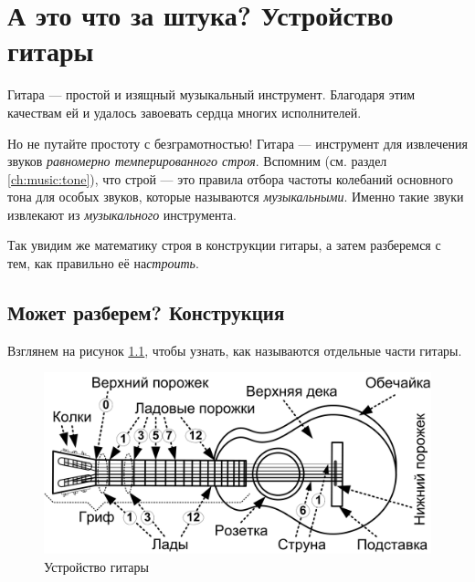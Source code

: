 \chapter{А это что за штука? Устройство гитары}
\label{ch:guitar}

Гитара --- простой и изящный музыкальный инструмент. Благодаря этим качествам ей и удалось завоевать сердца многих исполнителей.

Но не путайте простоту с безграмотностью! Гитара --- инструмент для извлечения звуков \emph{равномерно темперированного строя}. Вспомним (см. раздел \ref{ch:music:tone}), что строй --- это правила отбора частоты колебаний основного тона для особых звуков, которые называются \emph{музыкальными}. Именно такие звуки извлекают из \emph{музыкального} инструмента.

Так увидим же математику строя в конструкции гитары, а затем разберемся с тем, как правильно её на\emph{строить}.


\section{Может разберем? Конструкция}
\label{ch:guitar:construction}

Взглянем на рисунок \ref{fig:guitar:construction}, чтобы узнать, как называются отдельные части гитары.

\begin{figure}[!ht]
    \centering
    \includegraphics{fig/guitar-construction} 
    \caption{Устройство гитары}\label{fig:guitar:construction}
\end{figure} 

